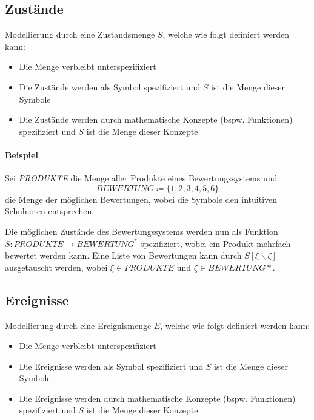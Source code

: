 														\subsection{Zustände}
															Modellierung durch eine Zustandsmenge $ S $, welche wie folgt definiert werden kann:
															\begin{itemize}
																\item Die Menge verbleibt unterspezifiziert
																\item Die Zustände werden als Symbol spezifiziert und $ S $ ist die Menge dieser Symbole
																\item Die Zustände werden durch mathematische Konzepte (bspw. Funktionen) spezifiziert und $ S $ ist die Menge dieser Konzepte
															\end{itemize}

															\paragraph{Beispiel}
																Sei \textit{PRODUKTE} die Menge aller Produkte eines Bewertungssystems und \[ \textit{BEWERTUNG} \coloneqq \{ 1, 2, 3, 4, 5, 6 \} \] die Menge der möglichen Bewertungen, wobei die Symbole den intuitiven Schulnoten entsprechen.

																Die möglichen Zustände des Bewertungssystems werden nun als Funktion $ S : \textit{PRODUKTE} \rightarrow \textit{BEWERTUNG} ^ * $ spezifiziert, wobei ein Produkt mehrfach bewertet werden kann. Eine Liste von Bewertungen kann durch $ S[\xi \backslash \zeta] $ ausgetauscht werden, wobei $ \xi \in \textit{PRODUKTE} $ und $ \zeta \in \textit{BEWERTUNG}* $.

														\subsection{Ereignisse}
															Modellierung durch eine Ereignismenge $ E $, welche wie folgt definiert werden kann:
															\begin{itemize}
																\item Die Menge verbleibt unterspezifiziert
																\item Die Ereignisse werden als Symbol spezifiziert und $ S $ ist die Menge dieser Symbole
																\item Die Ereignisse werden durch mathematische Konzepte (bspw. Funktionen) spezifiziert und $ S $ ist die Menge dieser Konzepte
															\end{itemize}

